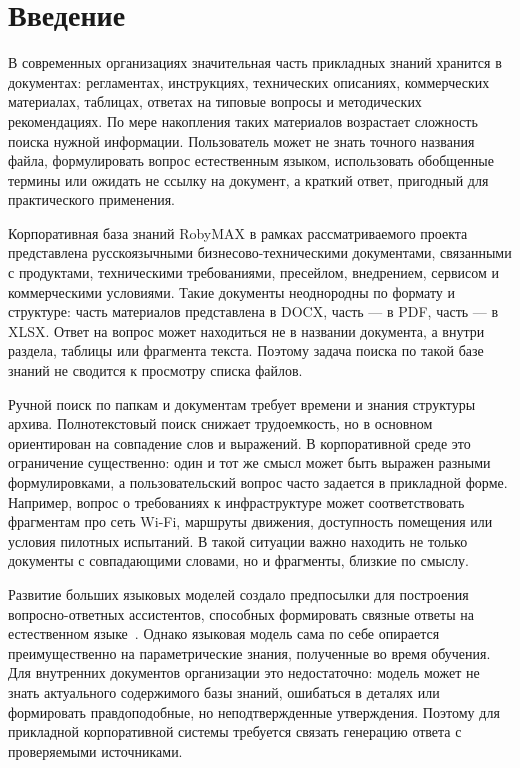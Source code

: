 \chapter*{Введение}

В современных организациях значительная часть прикладных знаний хранится в документах: регламентах, инструкциях, технических описаниях, коммерческих материалах, таблицах, ответах на типовые вопросы и методических рекомендациях. По мере накопления таких материалов возрастает сложность поиска нужной информации. Пользователь может не знать точного названия файла, формулировать вопрос естественным языком, использовать обобщенные термины или ожидать не ссылку на документ, а краткий ответ, пригодный для практического применения.

Корпоративная база знаний RobyMAX в рамках рассматриваемого проекта представлена русскоязычными бизнесово-техническими документами, связанными с продуктами, техническими требованиями, пресейлом, внедрением, сервисом и коммерческими условиями. Такие документы неоднородны по формату и структуре: часть материалов представлена в DOCX, часть — в PDF, часть — в XLSX. Ответ на вопрос может находиться не в названии документа, а внутри раздела, таблицы или фрагмента текста. Поэтому задача поиска по такой базе знаний не сводится к просмотру списка файлов.

Ручной поиск по папкам и документам требует времени и знания структуры архива. Полнотекстовый поиск снижает трудоемкость, но в основном ориентирован на совпадение слов и выражений. В корпоративной среде это ограничение существенно: один и тот же смысл может быть выражен разными формулировками, а пользовательский вопрос часто задается в прикладной форме. Например, вопрос о требованиях к инфраструктуре может соответствовать фрагментам про сеть Wi-Fi, маршруты движения, доступность помещения или условия пилотных испытаний. В такой ситуации важно находить не только документы с совпадающими словами, но и фрагменты, близкие по смыслу.

Развитие больших языковых моделей создало предпосылки для построения вопросно-ответных ассистентов, способных формировать связные ответы на естественном языке~\cite{Vaswani2017Attention}. Однако языковая модель сама по себе опирается преимущественно на параметрические знания, полученные во время обучения. Для внутренних документов организации это недостаточно: модель может не знать актуального содержимого базы знаний, ошибаться в деталях или формировать правдоподобные, но неподтвержденные утверждения. Поэтому для прикладной корпоративной системы требуется связать генерацию ответа с проверяемыми источниками.


